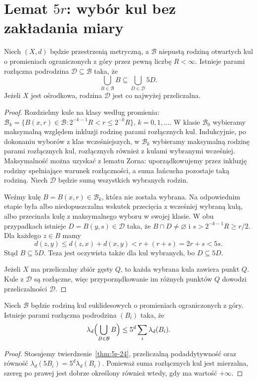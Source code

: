 \section{Lemat \texorpdfstring{$5r$}{5r}: wybór kul bez zakładania miary}
\begin{twierdzenie}
\label{thm:5r-24}
Niech $(X,d)$ będzie przestrzenią metryczną, a $\mathcal B$
niepustą rodziną otwartych kul o promieniach ograniczonych
z góry przez pewną liczbę $R<\infty$.
Istnieje parami rozłączna podrodzina $\mathcal D\subseteq\mathcal B$
taka, że
\[
 \bigcup_{B\in\mathcal B}B\subseteq\bigcup_{D\in\mathcal D}5D.
\]
Jeżeli $X$ jest ośrodkowa, rodzina $\mathcal D$ jest co najwyżej
przeliczalna.
\end{twierdzenie}
\begin{proof}
Rozdzielmy kule na klasy według promienia:
$\mathcal B_k=\{B(x,r)\in\mathcal B:
2^{-k-1}R<r\le2^{-k}R\}$, $k=0,1,\ldots$.
W klasie $\mathcal B_0$ wybieramy maksymalną względem inkluzji
rodzinę parami rozłącznych kul. Indukcyjnie, po dokonaniu wyborów
z klas wcześniejszych, w $\mathcal B_k$ wybieramy maksymalną
rodzinę parami rozłącznych kul, rozłącznych również z kulami
wybranymi wcześniej. Maksymalność można uzyskać z lematu
Zorna: uporządkowujemy przez inkluzję rodziny spełniające
warunek rozłączności, a suma łańcucha pozostaje taką rodziną.
Niech $\mathcal D$ będzie sumą wszystkich wybranych rodzin.

Weźmy kulę $B=B(x,r)\in\mathcal B_k$, która nie została
wybrana. Na odpowiednim etapie była albo niedopuszczalna
wskutek przecięcia z wcześniej wybraną kulą, albo przecinała
kulę z maksymalnego wyboru w swojej klasie. W obu przypadkach
istnieje $D=B(y,s)\in\mathcal D$ taka, że $B\cap D\ne\varnothing$
i $s>2^{-k-1}R\ge r/2$. Dla każdego $z\in B$ mamy
\[
 d(z,y)\le d(z,x)+d(x,y)<r+(r+s)=2r+s<5s.
\]
Stąd $B\subseteq5D$. Teza jest oczywista także dla kul
wybranych, bo $D\subseteq5D$.

Jeżeli $X$ ma przeliczalny zbiór gęsty $Q$, to każda wybrana
kula zawiera punkt $Q$. Kule z $\mathcal D$ są rozłączne,
więc przyporządkowanie im różnych punktów $Q$ dowodzi
przeliczalności $\mathcal D$.
\end{proof}

\begin{wniosek}
\label{cor:5r-volume-24}
Niech $\mathcal B$ będzie rodziną kul euklidesowych o promieniach
ograniczonych z góry. Istnieje parami rozłączna podrodzina
$(B_i)$ taka, że
\[
 \lambda_d\Bigl(\bigcup_{B\in\mathcal B}B\Bigr)
 \le 5^d\sum_i\lambda_d(B_i).
\]
\end{wniosek}
\begin{proof}
Stosujemy twierdzenie~\ref{thm:5r-24}, przeliczalną
podaddytywność oraz równość $\lambda_d(5B_i)=5^d\lambda_d(B_i)$.
Ponieważ suma rozłącznych kul jest mierzalna, szereg po prawej
jest dobrze określony również wtedy, gdy ma wartość $+\infty$.
\end{proof}


